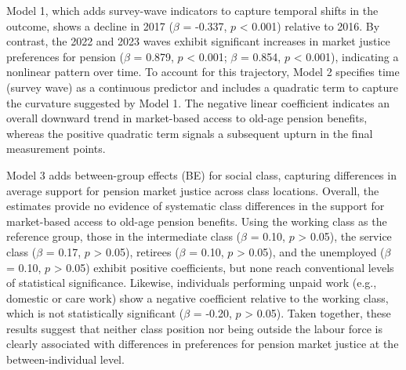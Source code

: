 \documentclass[
  12pt,
]{article}
\begin{document}
\begin{table}
{}

\end{table}%

Model 1, which adds survey-wave indicators to capture temporal shifts in
the outcome, shows a decline in 2017 (\(\beta\) = -0.337, \(p\)
\textless{} 0.001) relative to 2016. By contrast, the 2022 and 2023
waves exhibit significant increases in market justice preferences for
pension (\(\beta\) = 0.879, \(p\) \textless{} 0.001; \(\beta\) = 0.854,
\(p\) \textless{} 0.001), indicating a nonlinear pattern over time. To
account for this trajectory, Model 2 specifies time (survey wave) as a
continuous predictor and includes a quadratic term to capture the
curvature suggested by Model 1. The negative linear coefficient
indicates an overall downward trend in market-based access to old-age
pension benefits, whereas the positive quadratic term signals a
subsequent upturn in the final measurement points.

Model 3 adds between-group effects (BE) for social class, capturing
differences in average support for pension market justice across class
locations. Overall, the estimates provide no evidence of systematic
class differences in the support for market-based access to old-age
pension benefits. Using the working class as the reference group, those
in the intermediate class (\(\beta\) = 0.10, \(p\) \textgreater{} 0.05),
the service class (\(\beta\) = 0.17, \(p\) \textgreater{} 0.05),
retirees (\(\beta\) = 0.10, \(p\) \textgreater{} 0.05), and the
unemployed (\(\beta\) = 0.10, \(p\) \textgreater{} 0.05) exhibit
positive coefficients, but none reach conventional levels of statistical
significance. Likewise, individuals performing unpaid work (e.g.,
domestic or care work) show a negative coefficient relative to the
working class, which is not statistically significant (\(\beta\) =
-0.20, \(p\) \textgreater{} 0.05). Taken together, these results suggest
that neither class position nor being outside the labour force is
clearly associated with differences in preferences for pension market
justice at the between-individual level.
\end{document}

